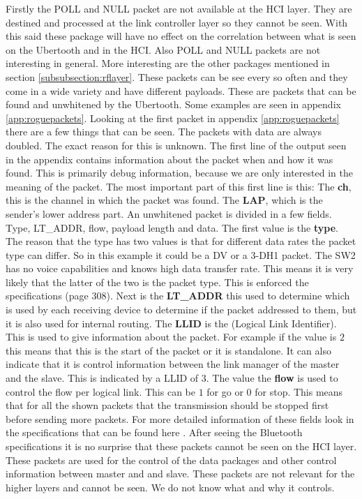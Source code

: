Firstly the POLL and NULL packet are not available at the HCI layer. They are destined and processed at the link controller layer so they cannot be seen. With this said these package will have no effect on the correlation between what is seen on the Ubertooth and in the HCI. Also POLL and NULL packets are not interesting in general. More interesting are the other packages mentioned in section \ref{subsubsection:rflayer}. These packets can be see every so often and they come in a wide variety and have different payloads.
These are packets that can be found and unwhitened by the Ubertooth.
Some examples are seen in appendix \ref{app:roguepackets}.
Looking at the first packet in appendix \ref{app:roguepackets} there are a few things that can be seen. The packets with data are always doubled. The exact reason for this is unknown. The first line of the output seen in the appendix contains information about the packet when and how it was found. This is primarily debug information, because we are only interested in the meaning of the packet. The most important part of this first line is this:
The \textbf{ch}, this is the channel in which the packet was found.
The \textbf{LAP}, which is the sender's lower address part. \pend
An unwhitened packet is divided in a few fields. Type, LT\_ADDR, flow, payload length and data.
The first value is the \textbf{type}. The reason that the type has two values is that for different data rates the packet type can differ. So in this example it could be a DV or a 3-DH1 packet. The SW2 has no voice capabilities and knows high data transfer rate. This means it is very likely that the latter of the two is the packet type. This is enforced the specifications \cite{bt3.0}(page 308).
Next is the \textbf{LT\_ADDR} this used to determine which is used by each receiving device to determine if the packet addressed to them, but it is also used for internal routing.
The \textbf{LLID} is the (Logical Link Identifier). This is used to give information about the packet. For example if the value is $2$ this means that this is the start of the packet or it is standalone. It can also indicate that it is control information between the link manager of the master and the slave. This is indicated by a LLID of $3$.
The value the \textbf{flow} is used to control the flow per logical link. This can be $1$ for go or $0$ for stop. This means that for all the shown packets that the transmission should be stopped first before sending more packets.
For more detailed information of these fields look in the specifications that can be found here \cite{bt3.0}.
After seeing the Bluetooth specifications it is no surprise that these packets cannot be seen on the HCI layer. These packets are used for the control of the data packages and other control information between master and and slave. These packets are not relevant for the higher layers and cannot be seen. We do not know what and why it controls.
